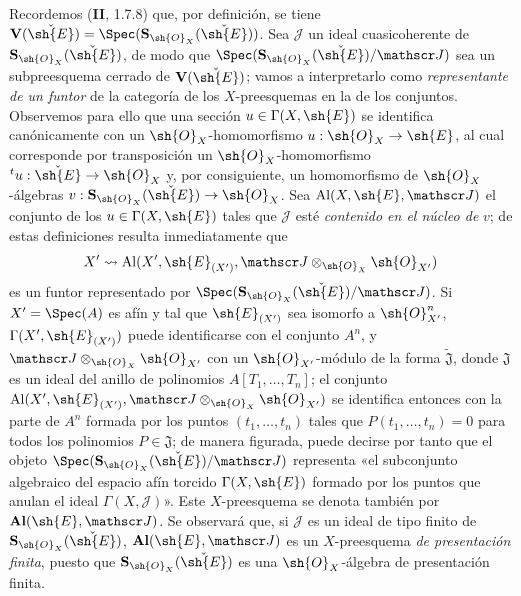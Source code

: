 \begin{env}[18.5.2]
\label{IV.18.5.2}
Recordemos (\textbf{II}, 1.7.8) que, por definición, se tiene $\mathbf V(\check{\sh{E}})=\Spec(\mathbf S_{\sh{O}_X}(\check{\sh{E}}))$. Sea $\mathscr J$ un ideal cuasicoherente de $\mathbf S_{\sh{O}_X}(\check{\sh{E}})$, de modo que $\Spec(\mathbf S_{\sh{O}_X}(\check{\sh{E}})/\mathscr J)$ sea un subpreesquema cerrado de $\mathbf V(\check{\sh{E}})$; vamos a interpretarlo como \emph{representante de un funtor} de la categoría de los $X$-preesquemas en la de los conjuntos. Observemos para ello que una sección $u\in\Gamma(X,\sh{E})$ se identifica canónicamente con un $\sh{O}_X$-homomorfismo $u:\sh{O}_X\to\sh{E}$, al cual corresponde por transposición un $\sh{O}_X$-homomorfismo ${}^t u:\check{\sh{E}}\to\sh{O}_X$ y, por consiguiente, un homomorfismo de $\sh{O}_X$-álgebras $v:\mathbf S_{\sh{O}_X}(\check{\sh{E}})\to\sh{O}_X$. Sea $\operatorname{Al}(X,\sh{E},\mathscr J)$ el conjunto de los $u\in\Gamma(X,\sh{E})$ tales que $\mathscr J$ esté \emph{contenido en el núcleo de} $v$; de estas definiciones resulta inmediatamente que
\[
  X'\leadsto\operatorname{Al}(X',\sh{E}_{(X')},\mathscr J\otimes_{\sh{O}_X}\sh{O}_{X'})
\]
es un funtor representado por $\Spec(\mathbf S_{\sh{O}_X}(\check{\sh{E}})/\mathscr J)$. Si $X'=\Spec(A)$ es afín y tal que $\sh{E}_{(X')}$ sea isomorfo a $\sh{O}_{X'}^n$, $\Gamma(X',\sh{E}_{(X')})$ puede identificarse con el conjunto $A^n$, y $\mathscr J\otimes_{\sh{O}_X}\sh{O}_{X'}$ con un $\sh{O}_{X'}$-módulo de la forma $\widetilde{\mathfrak J}$, donde $\mathfrak J$ es un ideal del anillo de polinomios $A[T_1,\ldots,T_n]$; el conjunto $\operatorname{Al}(X',\sh{E}_{(X')},\mathscr J\otimes_{\sh{O}_X}\sh{O}_{X'})$ se identifica entonces con la parte de $A^n$ formada por los puntos $(t_1,\ldots,t_n)$ tales que $P(t_1,\ldots,t_n)=0$ para todos los polinomios $P\in\mathfrak J$; de manera figurada, puede decirse por tanto que el objeto $\Spec(\mathbf S_{\sh{O}_X}(\check{\sh{E}})/\mathscr J)$ representa «el subconjunto algebraico del espacio afín torcido $\Gamma(X,\sh{E})$ formado por los puntos que anulan el ideal $\Gamma(X,\mathscr J)$». Este $X$-preesquema se denota también por $\mathbf{Al}(\sh{E},\mathscr J)$. Se observará que, si $\mathscr J$ es un ideal de tipo finito de $\mathbf S_{\sh{O}_X}(\check{\sh{E}})$, $\mathbf{Al}(\sh{E},\mathscr J)$ es un $X$-preesquema \emph{de presentación finita}, puesto que $\mathbf S_{\sh{O}_X}(\check{\sh{E}})$ es una $\sh{O}_X$-álgebra de presentación finita.
\end{env}

